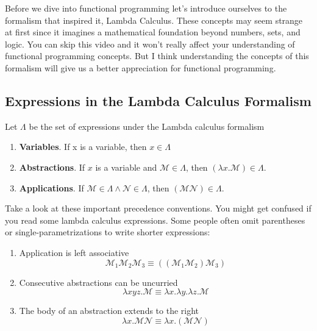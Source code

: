 Before we dive into functional programming let's introduce ourselves to
the formalism that inspired it, Lambda Calculus. These concepts may seem
strange at first since it imagines a mathematical foundation beyond
numbers, sets, and logic. You can skip this video and it won't really
affect your understanding of functional programming concepts. But I
think understanding the concepts of this formalism will give us a better
appreciation for functional programming.

\subsection{Expressions in the Lambda Calculus
Formalism}\label{functional-programming-paradigm.md__expressions-in-the-lambda-calculus-formalism}

Let \(\Lambda\) be the set of expressions under the Lambda calculus
formalism

\begin{enumerate}
\def\labelenumi{\arabic{enumi}.}
\tightlist
\item
  \textbf{Variables}. If x is a variable, then \(x \in \Lambda\)
\item
  \textbf{Abstractions}. If \(x\) is a variable and
  \(\mathscr{M} \in \Lambda\), then
  \((\lambda x. \mathscr{M}) \in \Lambda\).
\item
  \textbf{Applications}. If
  \(\mathscr{M} \in \Lambda \land \mathscr{N} \in \Lambda\), then
  \((\mathscr{M} \mathscr{N}) \in \Lambda\).
\end{enumerate}

Take a look at these important precedence conventions. You might get
confused if you read some lambda calculus expressions. Some people often
omit parentheses or single-parametrizations to write shorter
expressions:

\begin{enumerate}
\def\labelenumi{\arabic{enumi}.}
\item
  Application is left associative \[
  \mathscr{M_1}\mathscr{M_2}\mathscr{M_3} \equiv ((\mathscr{M_1}\mathscr{M_2})\mathscr{M_3})
  \]
\item
  Consecutive abstractions can be uncurried \[
  \lambda xyz.\mathscr{M}\equiv\lambda x.\lambda y.\lambda z.\mathscr{M}
  \]
\item
  The body of an abstraction extends to the right \[
  \lambda x.\mathscr{M}\mathscr{N}\equiv\lambda x.(\mathscr{M}\mathscr{N})
  \]
\end{enumerate}

